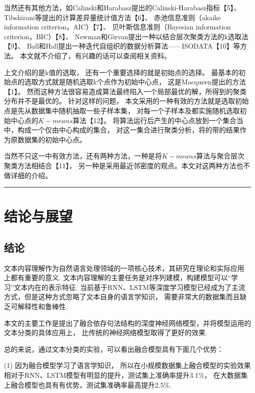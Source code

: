 \documentclass[bachelor,adobefonts]{jnuthesis}
\begin{document}
当然还有其他方法，如Calinski和Harabasz提出的Calinski-Harabasz指标【5】、
Tibshirani等提出的计算差异量统计值方法【6】、
赤池信息准则（akaike information criterion，AIC）【7】、
贝叶斯信息准则（Bayesian information criterion，BIC）【8】、
Newman和Girvan提出一种以结合层次聚类方法的k选取法【9】、
Ball和Hall提出一种迭代自组织的数据分析算法——ISODATA【10】等方法。
本文就不介绍了，有兴趣的话可以查阅相关资料。

上文介绍的是k值的选取，
还有一个重要选择的就是初始点的选择。
最基本的初始点的选取方式就是随机选取k个点作为初始中心点，
这是Macqueen提出的方法【1】。
然而这种方法很容易造成算法最终陷入一个局部最优的解，所得到的聚类分布并不是最优的。
针对这样的问题，
本文采用的一种有效的方法就是选取初始点是先从数据集中随机抽取一些子样本集，
对每一个子样本及都实施随机选取初始中心点的$K-means$算法【12】。
将算法运行后产生的中心点放到一个集合当中，构成一个仅由中心构成的集合，
对这一集合进行聚类分析，将的带的结果作为原数据集的初始中心点。



当然不只这一中有效方法，还有两种方法，一种是将$K-means$算法与聚合层次聚类方法相结合【11】，
另一种是采用最近邻密度的观点。本文对这两种方法也不做详细的介绍。






\rule{\textwidth}{0.5pt}


\chapter{结论与展望}
\section{结论}
文本内容理解作为自然语言处理领域的一项核心技术，其研究在理论和实际应用
上都有重要的意义.
文本内容理解的主要任务是对序列建模，构建模型可以“学习”文本内在的表示特征.
当前基于RNN、LSTM等深度学习模型已经成为了主流方式，但是这种方式忽略了文本自身的语言学知识，
需要非常大的数据集而且缺乏可解释性和鲁棒性.

本文的主要工作是提出了融合依存句法结构的深度神经网络模型，并将模型运用的文本分类的具体应用上，
比传统的神经网络模型取得了更好的效果.

总的来说，通过文本分类的实验，可以看出融合模型具有下面几个优势：

(1) 因为融合模型学习了语言学知识，
所以在小规模数据集上融合模型的实验效果相对于RNN、LSTM模型有明显的提升，测试集上准确率提升3.1\%，
在大数据集上融合模型也具有有优势，测试集准确率最高提升2.5\%.
\end{document}
